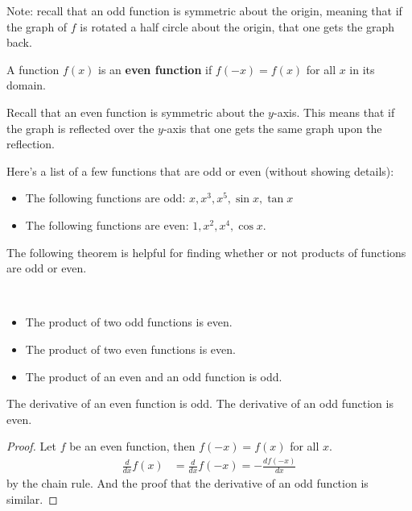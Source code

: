 Note: recall that an odd function is symmetric about the origin, meaning that if the graph of $f$ is rotated a half circle about the origin, that one gets the graph back.  

\begin{definition}
A function $f(x)$ is an \textbf{even function} if $f(-x)=f(x)$ for all $x$ in its domain.   
\end{definition}

Recall that an even function is symmetric about the $y$-axis.  This means that if the graph is reflected over the $y$-axis that one gets the same graph upon the reflection. 



\begin{example}
Here's a list of a few functions that are odd or even (without showing details): 
\begin{itemize}
\item The following functions are odd: $x, x^3, x^5, \sin x, \tan x$ 

\item The following functions are even: $1,x^2,x^4, \cos x$.  
\end{itemize}

\end{example}

The following theorem is helpful for finding whether or not products of functions are odd or even.

\begin{theorem}  ~~

\begin{itemize}
\item The product of two odd functions is even.  
\item The product of two even functions is even. 
\item The product of an even and an odd function is odd. 
\end{itemize}

\end{theorem}

\begin{lemma}
The derivative of an even function is odd.  The derivative of an odd function is even. 
\end{lemma}

\begin{proof}
Let $f$ be an even function, then $f(-x) = f(x)$ for all $x$. 
% 
\begin{align*}
\frac{d}{dx} f(x) & = \frac{d}{dx} f(-x) = -\frac{df(-x)}{dx}
\end{align*}
by the chain rule.   And the proof that the derivative of an odd function is similar. 
\end{proof}

